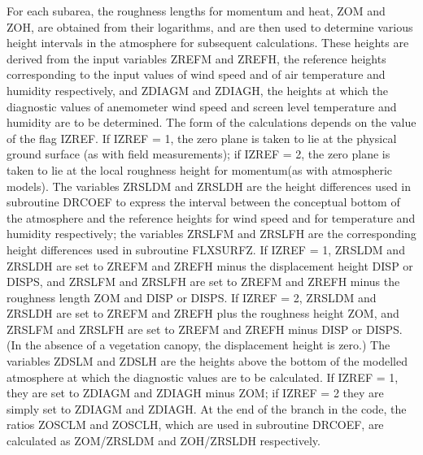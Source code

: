 For each subarea, the roughness lengths for momentum and heat, Z\+O\+M and Z\+O\+H, are obtained from their logarithms, and are then used to determine various height intervals in the atmosphere for subsequent calculations. These heights are derived from the input variables Z\+R\+E\+F\+M and Z\+R\+E\+F\+H, the reference heights corresponding to the input values of wind speed and of air temperature and humidity respectively, and Z\+D\+I\+A\+G\+M and Z\+D\+I\+A\+G\+H, the heights at which the diagnostic values of anemometer wind speed and screen level temperature and humidity are to be determined. The form of the calculations depends on the value of the flag I\+Z\+R\+E\+F. If I\+Z\+R\+E\+F = 1, the zero plane is taken to lie at the physical ground surface (as with field measurements); if I\+Z\+R\+E\+F = 2, the zero plane is taken to lie at the local roughness height for momentum(as with atmospheric models). The variables Z\+R\+S\+L\+D\+M and Z\+R\+S\+L\+D\+H are the height differences used in subroutine D\+R\+C\+O\+E\+F to express the interval between the conceptual bottom of the atmosphere and the reference heights for wind speed and for temperature and humidity respectively; the variables Z\+R\+S\+L\+F\+M and Z\+R\+S\+L\+F\+H are the corresponding height differences used in subroutine F\+L\+X\+S\+U\+R\+F\+Z. If I\+Z\+R\+E\+F = 1, Z\+R\+S\+L\+D\+M and Z\+R\+S\+L\+D\+H are set to Z\+R\+E\+F\+M and Z\+R\+E\+F\+H minus the displacement height D\+I\+S\+P or D\+I\+S\+P\+S, and Z\+R\+S\+L\+F\+M and Z\+R\+S\+L\+F\+H are set to Z\+R\+E\+F\+M and Z\+R\+E\+F\+H minus the roughness length Z\+O\+M and D\+I\+S\+P or D\+I\+S\+P\+S. If I\+Z\+R\+E\+F = 2, Z\+R\+S\+L\+D\+M and Z\+R\+S\+L\+D\+H are set to Z\+R\+E\+F\+M and Z\+R\+E\+F\+H plus the roughness height Z\+O\+M, and Z\+R\+S\+L\+F\+M and Z\+R\+S\+L\+F\+H are set to Z\+R\+E\+F\+M and Z\+R\+E\+F\+H minus D\+I\+S\+P or D\+I\+S\+P\+S. (In the absence of a vegetation canopy, the displacement height is zero.) The variables Z\+D\+S\+L\+M and Z\+D\+S\+L\+H are the heights above the bottom of the modelled atmosphere at which the diagnostic values are to be calculated. If I\+Z\+R\+E\+F = 1, they are set to Z\+D\+I\+A\+G\+M and Z\+D\+I\+A\+G\+H minus Z\+O\+M; if I\+Z\+R\+E\+F = 2 they are simply set to Z\+D\+I\+A\+G\+M and Z\+D\+I\+A\+G\+H. At the end of the branch in the code, the ratios Z\+O\+S\+C\+L\+M and Z\+O\+S\+C\+L\+H, which are used in subroutine D\+R\+C\+O\+E\+F, are calculated as Z\+O\+M/\+Z\+R\+S\+L\+D\+M and Z\+O\+H/\+Z\+R\+S\+L\+D\+H respectively.

